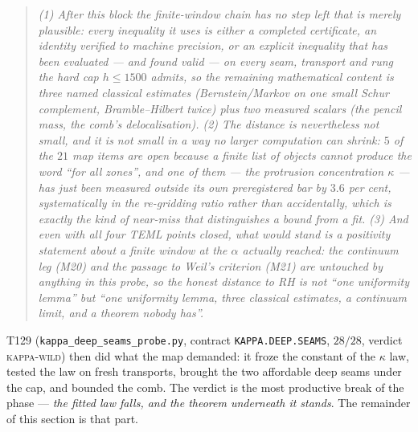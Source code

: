 \documentclass[11pt,a4paper]{article}
\begin{document}
\begin{quote}\itshape
(1) After this block the finite-window chain has no step left that is merely plausible: every
inequality it uses is either a completed certificate, an identity verified to machine precision,
or an explicit inequality that has been evaluated --- and found valid --- on every seam,
transport and rung the hard cap $h\le1500$ admits, so the remaining mathematical content is three
named classical estimates (Bernstein/Markov on one small Schur complement, Bramble--Hilbert
twice) plus two measured scalars (the pencil mass, the comb's delocalisation). (2) The distance
is nevertheless not small, and it is not small in a way no larger computation can shrink: $5$ of
the $21$ map items are open because a finite list of objects cannot produce the word ``for all
zones'', and one of them --- the protrusion concentration $\kappa$ --- has just been measured
outside its own preregistered bar by $3.6$ per cent, systematically in the re-gridding ratio
rather than accidentally, which is exactly the kind of near-miss that distinguishes a bound from
a fit. (3) And even with all four TEML points closed, what would stand is a positivity statement
about a finite window at the $\alpha$ actually reached: the continuum leg (M20) and the passage
to Weil's criterion (M21) are untouched by anything in this probe, so the honest distance to RH
is not ``one uniformity lemma'' but ``one uniformity lemma, three classical estimates, a
continuum limit, and a theorem nobody has''.
\end{quote}

\noindent T129 (\texttt{kappa\_deep\_seams\_probe.py}, contract \texttt{KAPPA.DEEP.SEAMS},
$28/28$, verdict \textsc{kappa-wild}) then did what the map demanded: it froze the constant of
the $\kappa$ law, tested the law on fresh transports, brought the two affordable deep seams
under the cap, and bounded the comb. The verdict is the most productive break of the phase ---
\emph{the fitted law falls, and the theorem underneath it stands}. The remainder of this
section is that part.
\end{document}
